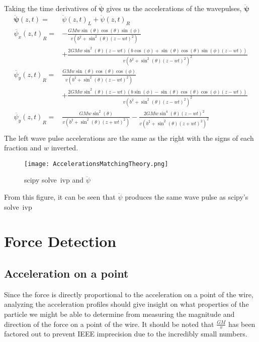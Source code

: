 \documentclass{report}
\begin{document}
Taking the time derivatives of $\mathbf{\dot{\psi}}$ gives us the accelerations of the wavepulses, $\mathbf{\ddot \psi}$
\begin{align}
    \mathbf{\ddot\psi} (z, t) =& {\ddot{\psi} (z, t)}_L + {\ddot{\psi} (z, t)}_R\label{eqn:acceleration_pulse}\\
    \nonumber {\ddot{\psi_x} (z, t)}_R =& -\frac{G M w \sin (\theta ) \cos (\theta ) \sin (\phi )}{v \left(b^2+\sin ^2(\theta ) {(z - w t)}^2\right) }\\
    & +\frac{2 G M w \sin ^2(\theta ) (z - w t) (b \cos (\phi )+\sin (\theta ) \cos (\theta ) \sin (\phi ) (z - w t))}{v {\left(b^2+\sin ^2(\theta ) {(z - w t)}^2\right)}^2}\\
    \nonumber {\ddot{\psi_y} (z, t)}_R =& \frac{G M w \sin (\theta ) \cos (\theta ) \cos (\phi )}{v \left(b^2+\sin ^2(\theta ) {(z - w t)}^2\right)}\\
    & +\frac{2 G M w \sin ^2(\theta ) (z - w t) (b \sin (\phi )-\sin (\theta ) \cos (\theta ) \cos (\phi ) (z - w t))}{v {\left(b^2+\sin ^2(\theta ) {(z - w t)}^2\right)}^2} \\
    \nonumber {\ddot{\psi_y} (z, t)}_R =& \frac{G M w \sin ^2(\theta )}{v \left(b^2+\sin ^2(\theta ) {(z + w t)}^2\right)} - \frac{2 G M w \sin ^4(\theta ) {(z - w t)}^2}{v {\left(b^2+\sin ^2(\theta ) {(z + w t)}^2\right)}^2}\\
\end{align} 
The left wave pulse accelerations are the same as the right with the signs of each fraction and $w$ inverted.

\begin{figure}[H]
    \texttt{[image: AccelerationsMatchingTheory.png]}
    \caption{scipy solve\textunderscore~ivp and $\ddot\psi$}\label{fig:matchFig}
\end{figure}
From this figure, it can be seen that $\ddot\psi$ produces the same wave pulse as scipy's solve\textunderscore~ivp
\chapter*{Force Detection}
\section*{Acceleration on a point}
Since the force is directly proportional to the acceleration on a point of the wire, analyzing the acceleration profiles should give insight on what properties of the particle we might be able to determine from measuring the magnitude and direction of the force on a point of the wire. 
It should be noted that $\frac{G M}{v}$ has been factored out to prevent IEEE imprecision due to the incredibly small numbers. 
\end{document}
